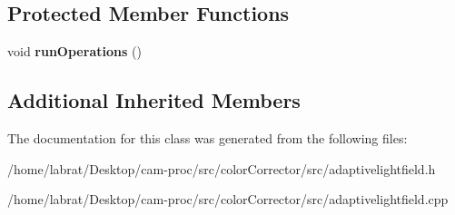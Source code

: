 \subsection*{Protected Member Functions}
\begin{DoxyCompactItemize}
\item 
void {\bfseries run\+Operations} ()\hypertarget{classAdaptiveLightfield_a5b060298ae68862e6f125a0c390ec229}{}\label{classAdaptiveLightfield_a5b060298ae68862e6f125a0c390ec229}

\end{DoxyCompactItemize}
\subsection*{Additional Inherited Members}


The documentation for this class was generated from the following files\+:\begin{DoxyCompactItemize}
\item 
/home/labrat/\+Desktop/cam-\/proc/src/color\+Corrector/src/adaptivelightfield.\+h\item 
/home/labrat/\+Desktop/cam-\/proc/src/color\+Corrector/src/adaptivelightfield.\+cpp\end{DoxyCompactItemize}
